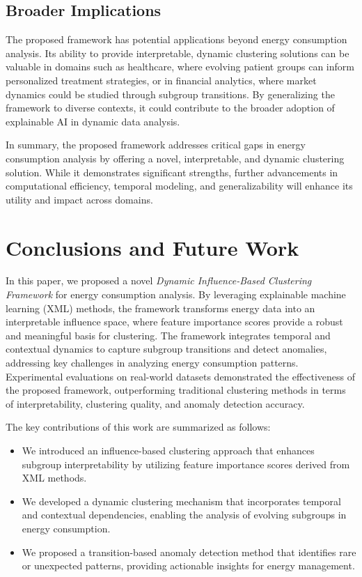 \documentclass[final,5p,times,twocolumn,numbers]{elsarticle}
\begin{document}
\subsection{Broader Implications}
The proposed framework has potential applications beyond energy consumption analysis. Its ability to provide interpretable, dynamic clustering solutions can be valuable in domains such as healthcare, where evolving patient groups can inform personalized treatment strategies, or in financial analytics, where market dynamics could be studied through subgroup transitions. By generalizing the framework to diverse contexts, it could contribute to the broader adoption of explainable AI in dynamic data analysis.

In summary, the proposed framework addresses critical gaps in energy consumption analysis by offering a novel, interpretable, and dynamic clustering solution. While it demonstrates significant strengths, further advancements in computational efficiency, temporal modeling, and generalizability will enhance its utility and impact across domains.
\section{Conclusions and Future Work}
\label{sec:con}
In this paper, we proposed a novel \textit{Dynamic Influence-Based Clustering Framework} for energy consumption analysis. By leveraging explainable machine learning (XML) methods, the framework transforms energy data into an interpretable influence space, where feature importance scores provide a robust and meaningful basis for clustering. The framework integrates temporal and contextual dynamics to capture subgroup transitions and detect anomalies, addressing key challenges in analyzing energy consumption patterns. Experimental evaluations on real-world datasets demonstrated the effectiveness of the proposed framework, outperforming traditional clustering methods in terms of interpretability, clustering quality, and anomaly detection accuracy.

The key contributions of this work are summarized as follows:
\begin{itemize}
    \item We introduced an influence-based clustering approach that enhances subgroup interpretability by utilizing feature importance scores derived from XML methods.
    \item We developed a dynamic clustering mechanism that incorporates temporal and contextual dependencies, enabling the analysis of evolving subgroups in energy consumption.
    \item We proposed a transition-based anomaly detection method that identifies rare or unexpected patterns, providing actionable insights for energy management.
\end{itemize}
\end{document}
